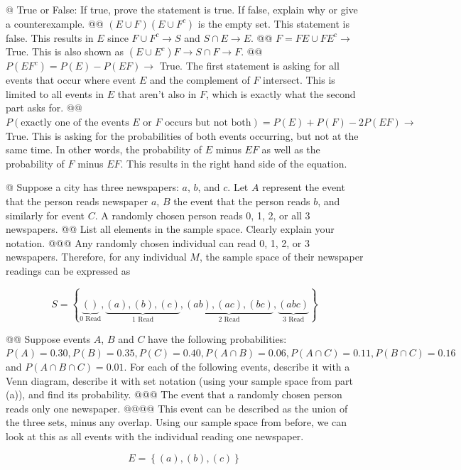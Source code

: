 \documentclass[10pt]{article}
\begin{document}
\begin{easylist}[enumerate]
    @ True or False: If true, prove the statement is true. If false, explain why or give a counterexample.
    @@ $(E \cup F)(E \cup F^c)$ is the empty set. This statement is false. This results in $E$ since $F \cup F^c \to S$ and $S \cap E \to E$.
    @@ $F = FE \cup FE^c \to $ True. This is also shown as $ ( E \cup E^c ) F \to S \cap F \to F$.
    @@ $P(EF^c) = P(E) - P(EF) \to $ True. The first statement is asking for all events that occur where event $E$ and the complement of $F$ intersect. This is limited to all events in $E$ that aren't also in $F$, which is exactly what the second part asks for.
    @@ $P(\text{exactly one of the events $E$ or $F$ occurs but not both}) = P(E) + P(F ) - 2P(EF) \to$ True. This is asking for the probabilities of both events occurring, but not at the same time. In other words, the probability of $E$ minus $EF$ as well as the probability of $F$ minus $EF$. This results in the right hand side of the equation.

    @ Suppose a city has three newspapers: $a$, $b$, and $c$. Let $A$ represent the event that the person reads newspaper $a$, $B$ the event that the person reads $b$, and similarly for event $C$. A randomly chosen person reads 0, 1, 2, or all 3 newspapers.
    @@ List all elements in the sample space. Clearly explain your notation.
    @@@ Any randomly chosen individual can read 0, 1, 2, or 3 newspapers. Therefore, for any individual $M$, the sample space of their newspaper readings can be expressed as

    \[ S = \left\{
                \underbrace{()}_{\text{0 Read} },
                \underbrace{(a), (b), (c)}_{\text{1 Read} },
                \underbrace{(ab), (ac), (bc)}_{\text{2 Read} },
                \underbrace{(abc)}_{\text{3 Read} }
        \right\} \]

    @@ Suppose events $A$, $B$ and $C$ have the following probabilities: $P(A) = 0.30, P(B) = 0.35, P(C) = 0.40, P(A \cap B) = 0.06, P(A \cap C) = 0.11, P(B \cap C) = 0.16$ and $P(A \cap B \cap C) = 0.01$. For each of the following events, describe it with a Venn diagram, describe it with set notation (using your sample space from part (a)), and find its probability.
    @@@ The event that a randomly chosen person reads only one newspaper.
    @@@@ This event can be described as the union of the three sets, minus any overlap. Using our sample space from before, we can look at this as all events with the individual reading one newspaper.

        \[ E = \left\{ (a), (b), (c) \right\} \]


\end{easylist}
\end{document}
